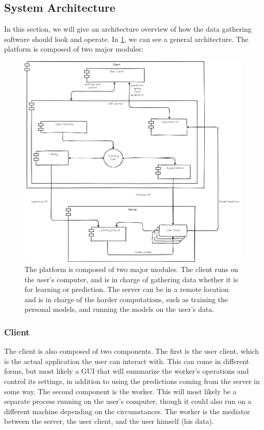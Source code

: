 \documentclass[../main.tex]{subfiles}
\begin{document}
\subsection{System Architecture}
In this section, we will give an architecture overview of how the data gathering software should look and operate.
In \ref{fig:system_architecture}, we can see a general architecture. The platform is composed of two major modules:

\begin{figure}[htp]
    \centering
    \includegraphics[width=12cm]{figures/platform_architecture.png}   
    \caption{The platform is composed of two major modules. The client runs on the user's computer,
        and is in charge of gathering data whether it is for learning or prediction.
        The server can be in a remote location and is in charge of the harder computations,
        such as training the personal models, and running the models on the user's data.}
    \label{fig:system_architecture} 
\end{figure}

\subsubsection{Client}
The client is also composed of two components. The first is the user client, which is the actual application the user can interact with.
This can come in different forms, but most likely a GUI that will summarize the worker's operations and control its settings,
in addition to using the predictions coming from the server in some way. The second component is the worker. This will most likely be a
separate process running on the user's computer, though it could also run on a different machine depending on the circumstances.
The worker is the mediator between the server, the user client, and the user himself (his data).
\end{document}
